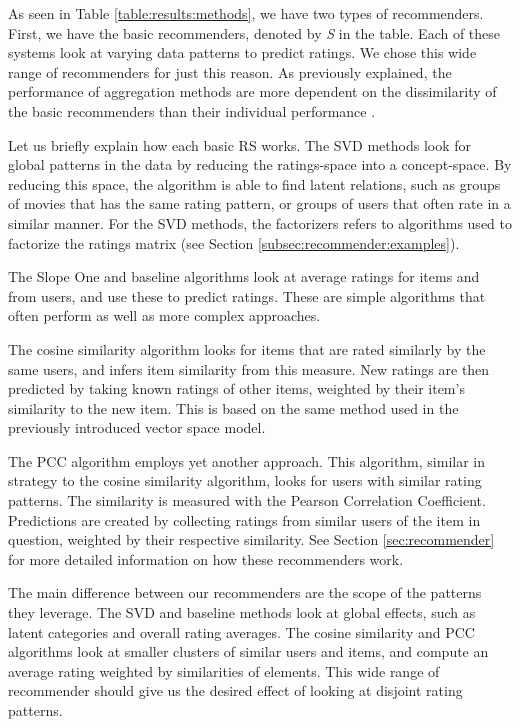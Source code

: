As seen in Table \ref{table:results:methods}, we have two types of recommenders.
First, we have the basic recommenders, denoted by \emph{S} in the table.
Each of these systems look at varying data patterns to predict ratings.
We chose this wide range of recommenders for just this reason.
As previously explained, the performance of aggregation methods
are more dependent on the dissimilarity of the basic recommenders
than their individual performance \cite[p6]{Bell2007}.

Let us briefly explain how each basic RS works.
The SVD methods look for global patterns in the data 
by reducing the ratings-space into a concept-space.
By reducing this space, the algorithm is able to find
latent relations, such as groups of movies that has the same
rating pattern, or groups of users that often rate in a similar manner.
For the SVD methods, the factorizers refers to algorithms used to factorize the ratings matrix
(see Section \ref{subsec:recommender:examples}).

The Slope One and baseline algorithms look at average
ratings for items and from users, and use these to predict ratings.
These are simple algorithms that often perform as well
as more complex approaches.

The cosine similarity algorithm looks for items that are rated
similarly by the same users, and infers item similarity from this measure.
New ratings are then predicted by taking known ratings of other items,
weighted by their item's similarity to the new item.
This is based on the same method used in the previously introduced vector space model.

The PCC algorithm employs yet another approach. This algorithm,
similar in strategy to the cosine similarity algorithm,
looks for users with similar rating patterns.
The similarity is measured with the Pearson Correlation Coefficient.
Predictions are created by collecting ratings from similar users
of the item in question, weighted by their respective similarity.
See Section \ref{sec:recommender} for more 
detailed information on how these recommenders work. 

The main difference between our recommenders are the scope of the patterns they leverage.
The SVD and baseline methods look at global effects, such as latent categories
and overall rating averages.
The cosine similarity and PCC algorithms look at smaller clusters of similar
users and items, and compute an average rating weighted by 
similarities of elements.
This wide range of recommender should give us the desired
effect of looking at disjoint rating patterns.


